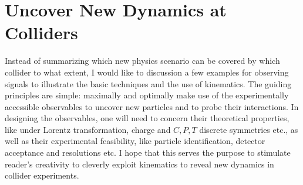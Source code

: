 \documentclass[12pt,prd,aps,floats,preprintnumbers,preprint,superscriptaddress,floatfix,nofootinbib]{revtex4}
\def\gev{{\rm GeV}}
\def\fb{{\rm fb}}
\def\cmsq{{\rm cm}^2}
\def\bea{\begin{eqnarray}}
\def\eea{\end{eqnarray}}
\begin{document}
\section{ Uncover New Dynamics at Colliders }
\label{uncover}

Instead of summarizing which new physics scenario can be covered
by which collider to what extent, I would like to discussion a few 
examples for observing signals to illustrate the basic techniques
and the use of kinematics. 
The guiding principles are simple: maximally and optimally make use
of the experimentally accessible observables to uncover new particles
and to probe their interactions. In designing the observables, one will
need to concern their theoretical properties, like under Lorentz transformation,
charge and $C,P,T$ discrete symmetries etc., as well as their experimental
feasibility, like particle identification,  detector acceptance and resolutions etc. 
I hope that this serves the purpose to 
stimulate reader's creativity to cleverly exploit kinematics to reveal 
new  dynamics in collider experiments.

\end{document}

